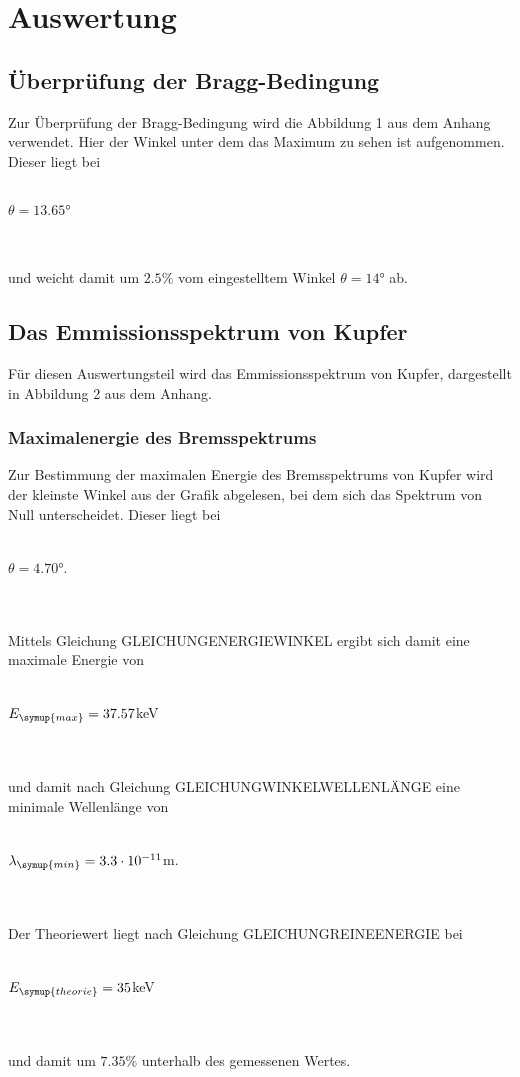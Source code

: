 \section{Auswertung}
\label{sec:Auswertung}

\subsection{Überprüfung der Bragg-Bedingung}
    Zur Überprüfung der Bragg-Bedingung wird die Abbildung 1 aus dem Anhang verwendet. 
    Hier der Winkel unter dem das Maximum zu sehen ist aufgenommen. Dieser liegt bei 
    \\ \\
    \centerline{$\theta = 13.65°$}
    \\ \\
    und weicht damit um $2.5\%$ vom eingestelltem Winkel $\theta = 14°$ ab.



\subsection{Das Emmissionsspektrum von Kupfer}
    Für diesen Auswertungsteil wird das Emmissionsspektrum von Kupfer, dargestellt in Abbildung 2
    aus dem Anhang. 
    \subsubsection{Maximalenergie des Bremsspektrums}
        Zur Bestimmung der maximalen Energie des Bremsspektrums von Kupfer wird der kleinste Winkel aus der Grafik abgelesen, bei dem sich 
        das Spektrum von Null unterscheidet. Dieser liegt bei 
        \\ \\
        \centerline{$\theta = 4.70° $.}
        \\ \\
        Mittels Gleichung GLEICHUNGENERGIEWINKEL ergibt sich damit eine maximale Energie von
        \\ \\
        \centerline{$E_{\symup{max}} = 37.57$keV}
        \\ \\ 
        und damit nach Gleichung GLEICHUNGWINKELWELLENLÄNGE eine minimale Wellenlänge von
        \\ \\
        \centerline{$\lambda_{\symup{min}} = 3.3 \cdot 10^{-11}$m.}
        \\ \\
        Der Theoriewert liegt nach Gleichung GLEICHUNGREINEENERGIE bei 
        \\ \\
        \centerline{$E_{\symup{theorie}} = 35$keV}
        \\ \\
        und damit um $7.35 \%$ unterhalb des gemessenen Wertes.

